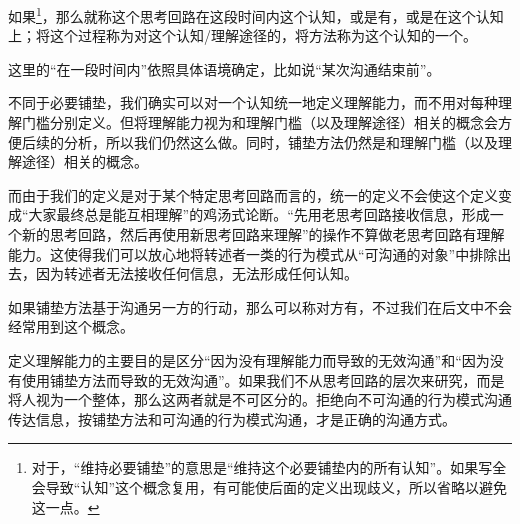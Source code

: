 如果\footnote{对于\rigorous，“维持必要铺垫”的意思是“维持这个必要铺垫内的所有认知”。如果写全会导致“认知”这个概念复用，有可能使后面的定义出现歧义，所以省略以避免这一点。}，那么就称这个思考回路在这段时间内这个认知，或是有\label{def:行为模式的理解能力}，或是在这个认知上；将这个过程称为对这个认知/理解途径的，将方法称为这个认知的一个。
\begin{explain}
这里的“在一段时间内”依照具体语境确定，比如说“某次沟通结束前”。

不同于必要铺垫，我们确实可以对一个认知统一地定义理解能力，而不用对每种理解门槛分别定义。但将理解能力视为和理解门槛（以及理解途径）相关的概念会方便后续的分析，所以我们仍然这么做。同时，铺垫方法仍然是和理解门槛（以及理解途径）相关的概念。

而由于我们的定义是对于某个特定思考回路而言的，统一的定义不会使这个定义变成“大家最终总是能互相理解”的鸡汤式论断。“先用老思考回路接收信息，形成一个新的思考回路，然后再使用新思考回路来理解”的操作不算做老思考回路有理解能力。这使得我们可以放心地将转述者一类的行为模式从“可沟通的对象”中排除出去，因为转述者无法接收任何信息，无法形成任何认知。

如果铺垫方法基于沟通另一方的行动，那么可以称对方有，不过我们在后文中不会经常用到这个概念。%


定义理解能力的主要目的是区分“因为没有理解能力而导致的无效沟通”和“因为没有使用铺垫方法而导致的无效沟通”。如果我们不从思考回路的层次来研究，而是将人视为一个整体，那么这两者就是不可区分的。拒绝向不可沟通的行为模式沟通传达信息，按铺垫方法和可沟通的行为模式沟通，才是正确的沟通方式。
\end{explain}

